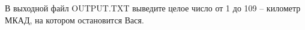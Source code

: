 В выходной файл OUTPUT.TXT выведите целое число от 1 до 109 -- километр МКАД, на котором остановится Вася.